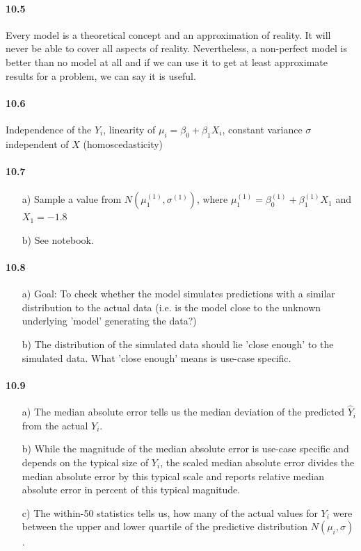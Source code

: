 \documentclass[fontsize=11pt,DIV=18,parskip=half]{scrartcl}
\begin{document}
\paragraph{10.5} Every model is a theoretical concept and an approximation of reality. It will never be able to cover all aspects of reality. Nevertheless, a non-perfect model is better than no model at all and if we can use it to get at least approximate results for a problem, we can say it is useful.

\paragraph{10.6} Independence of the $Y_i$, linearity of $\mu_i=\beta_0+\beta_1 X_i$, constant variance $\sigma$ independent of $X$ (homoscedasticity) 

\paragraph{10.7}
\begin{itemize}
\item[a)] Sample a value from $N\left(\mu_1^{(1)}, \sigma^{(1)}\right)$, where $\mu_1^{(1)} = \beta_0^{(1)} + \beta_1^{(1)} X_1$ and $X_1 = -1.8$
\item[b)] See notebook.
\end{itemize}

\paragraph{10.8}
\begin{itemize}
\item[a)] Goal: To check whether the model simulates predictions with a similar distribution to the actual data (i.e. is the model close to the unknown underlying 'model' generating the data?)
\item[b)] The distribution of the simulated data should lie 'close enough' to the simulated data. What 'close enough' means is use-case specific.
\end{itemize}

\paragraph{10.9}
\begin{itemize}
\item[a)] The median absolute error tells us the median deviation of the predicted $\hat{Y}_i$ from the actual $Y_i$.
\item[b)] While the magnitude of the median absolute error is use-case specific and depends on the typical size of $Y_i$, the scaled median absolute error divides the median absolute error by this typical scale and reports relative median absolute error in percent of this typical magnitude.
\item[c)] The within-50 statistics tells us, how many of the actual values for $Y_i$ were between the upper and lower quartile of the predictive distribution $N(\mu_i, \sigma)$.
\end{itemize}
\end{document}

